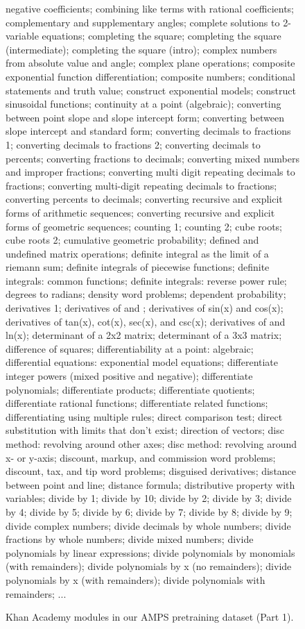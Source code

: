 \documentclass{article}
\begin{document}
\begin{figure*}
negative coefficients; combining like terms with rational coefficients; complementary and supplementary angles; complete solutions to 2-variable equations; completing the square; completing the square (intermediate); completing the square (intro); complex numbers from absolute value and angle; complex plane operations; composite exponential function differentiation; composite numbers; conditional statements and truth value; construct exponential models; construct sinusoidal functions; continuity at a point (algebraic); converting between point slope and slope intercept form; converting between slope intercept and standard form; converting decimals to fractions 1; converting decimals to fractions 2; converting decimals to percents; converting fractions to decimals; converting mixed numbers and improper fractions; converting multi digit repeating decimals to fractions; converting multi-digit repeating decimals to fractions; converting percents to decimals; converting recursive and explicit forms of arithmetic sequences; converting recursive and explicit forms of geometric sequences; counting 1; counting 2; cube roots; cube roots 2; cumulative geometric probability; defined and undefined matrix operations; definite integral as the limit of a riemann sum; definite integrals of piecewise functions; definite integrals: common functions; definite integrals: reverse power rule; degrees to radians; density word problems; dependent probability; derivatives 1; derivatives of  and ; derivatives of sin(x) and cos(x); derivatives of tan(x), cot(x), sec(x), and csc(x); derivatives of  and ln(x); determinant of a 2x2 matrix; determinant of a 3x3 matrix; difference of squares; differentiability at a point: algebraic; differential equations: exponential model equations; differentiate integer powers (mixed positive and negative); differentiate polynomials; differentiate products; differentiate quotients; differentiate rational functions; differentiate related functions; differentiating using multiple rules; direct comparison test; direct substitution with limits that don't exist; direction of vectors; disc method: revolving around other axes; disc method: revolving around x- or y-axis; discount, markup, and commission word problems; discount, tax, and tip word problems; disguised derivatives; distance between point and line; distance formula; distributive property with variables; divide by 1; divide by 10; divide by 2; divide by 3; divide by 4; divide by 5; divide by 6; divide by 7; divide by 8; divide by 9; divide complex numbers; divide decimals by whole numbers; divide fractions by whole numbers; divide mixed numbers; divide polynomials by linear expressions; divide polynomials by monomials (with remainders); divide polynomials by x (no remainders); divide polynomials by x (with remainders); divide polynomials with remainders; ...
\caption{Khan Academy modules in our AMPS pretraining dataset (Part 1).}
\label{fig:khan}
\end{figure*}
\end{document}

